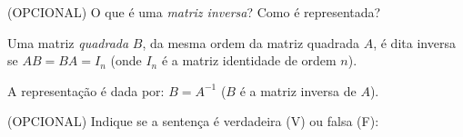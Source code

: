 \documentclass[pdftex, brazil, 12pt, oneside, addpoints]{exam}
\newcommand{\vf}[1][{}]{%
  \fillin[#1][0.25in]%
}
\begin{document}
\begin{questions}

\question
(OPCIONAL) O que é uma \emph{matriz inversa}? Como é representada?
\begin{solution}
  Uma matriz \emph{quadrada} $B$, da mesma ordem da matriz quadrada $A$, é dita inversa
  se $AB = BA = I_n$ (onde $I_n$ é a matriz identidade de ordem $n$).

  A representação é dada por: $B = A^{-1}$ ($B$ é a matriz inversa de $A$).
\end{solution}

\question
(OPCIONAL) Indique se a sentença é verdadeira (V) ou falsa (F):


\end{questions}
\end{document}

